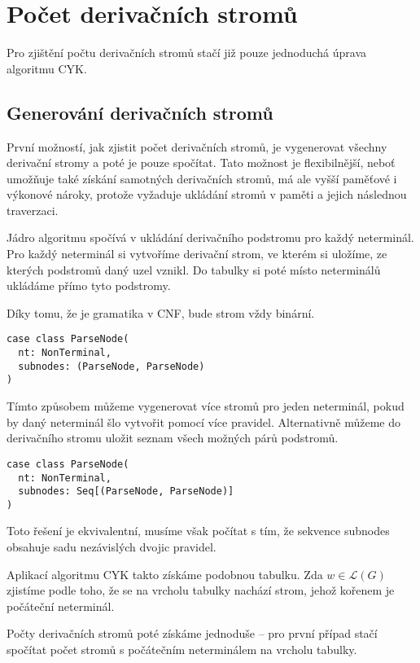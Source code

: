 \documentclass{article}
\begin{document}
\section{Počet derivačních stromů}

Pro zjištění počtu derivačních stromů stačí již pouze jednoduchá
úprava algoritmu CYK.

\subsection{Generování derivačních stromů}

První možností, jak zjistit počet derivačních stromů, je vygenerovat
všechny derivační stromy a poté je pouze spočítat. Tato možnost
je flexibilnější, neboť umožňuje také získání samotných derivačních
stromů, má ale vyšší paměťové i výkonové nároky, protože vyžaduje
ukládání stromů v paměti a jejich následnou traverzaci.

Jádro algoritmu spočívá v ukládání derivačního podstromu pro každý
neterminál. Pro každý neterminál si vytvoříme derivační strom,
ve kterém si uložíme, ze kterých podstromů daný uzel vznikl.
Do tabulky si poté místo neterminálů ukládáme přímo tyto podstromy.

Díky tomu, že je gramatika v CNF, bude strom vždy binární.

\begin{lstlisting}
case class ParseNode(
  nt: NonTerminal, 
  subnodes: (ParseNode, ParseNode)
)
\end{lstlisting}

Tímto způsobem můžeme vygenerovat více stromů pro jeden neterminál,
pokud by daný neterminál šlo vytvořit pomocí více pravidel. Alternativně
můžeme do derivačního stromu uložit seznam všech možných párů podstromů.

\begin{lstlisting}
case class ParseNode(
  nt: NonTerminal, 
  subnodes: Seq[(ParseNode, ParseNode)]
)
\end{lstlisting}

Toto řešení je ekvivalentní, musíme však počítat s tím, že sekvence
subnodes obsahuje sadu nezávislých dvojic pravidel.

Aplikací algoritmu CYK takto získáme podobnou tabulku. Zda
$w \in \mathcal{L}(G)$ zjistíme podle toho, že se na vrcholu tabulky
nachází strom, jehož kořenem je počáteční neterminál.

Počty derivačních stromů poté získáme jednoduše -- pro první případ
stačí spočítat počet stromů s počátečním neterminálem na vrcholu tabulky.
\end{document}

